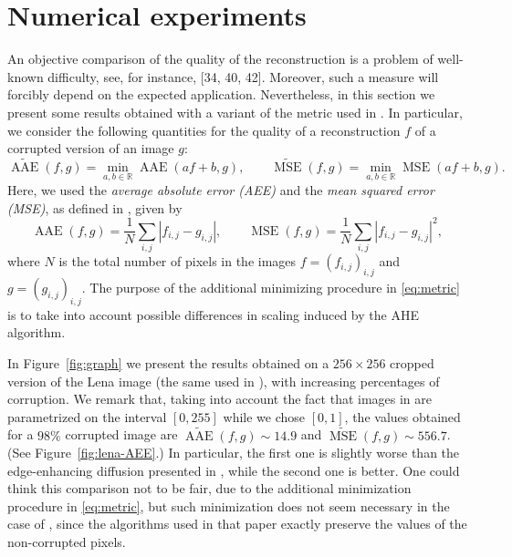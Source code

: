 \documentclass[proc]{edpsmath}
\begin{document}
{\color{magenta}
\section{Numerical experiments}\label{sec:comparison}

An objective comparison of the quality of the reconstruction is a problem of well-known difficulty, see, for instance, [34, 40, 42]. Moreover, such
a measure will forcibly depend on the expected application.
Nevertheless, in this section we present some results obtained with a variant of the metric used in \cite{GWWBBS}.
In particular, we consider the following quantities for the quality of a reconstruction $f$ of a corrupted version of an image $g$:
\begin{equation}\label{eq:metric}
  \widetilde{\operatorname{AAE}}(f,g) = \min_{a,b\in\mathbb R}\operatorname{AAE}(a f+b,g),\qquad
  \widetilde{\operatorname{MSE}}(f,g) = \min_{a,b\in\mathbb R}\operatorname{MSE}(a f+b,g).
\end{equation}
Here, we used the \emph{average absolute error (AEE)} and the \emph{mean squared error (MSE)}, as defined in \cite{GWWBBS}, given by
\begin{equation}
  \operatorname{AAE}(f,g) = \frac{1}{N}\sum_{i,j} |f_{i,j}-g_{i,j}|,\qquad
  \operatorname{MSE}(f,g) = \frac{1}{N}\sum_{i,j} |f_{i,j}-g_{i,j}|^2,
\end{equation}
where $N$ is the total number of pixels in the images $f=(f_{i,j})_{i,j}$ and $g=(g_{i,j})_{i,j}$. 
The purpose of the additional minimizing procedure in \eqref{eq:metric} is to take into account possible differences in scaling induced by the AHE algorithm. 

In Figure~\ref{fig:graph} we present the results obtained on a $256\times 256$ cropped version of the Lena image (the same used in \cite{GWWBBS}), with increasing percentages of corruption. 
We remark that, taking into account the fact that images in \cite{GWWBBS} are parametrized on the interval $[0,255]$ while we chose $[0,1]$, the values obtained for a $98\%$ corrupted image are $\widetilde{\operatorname{AAE}}(f,g)\sim14.9$ and $\widetilde{\operatorname{MSE}}(f,g)\sim556.7$. (See Figure~\ref{fig:lena-AEE}.) In particular, the first one is slightly worse than the edge-enhancing diffusion presented in \cite[Table~1]{GWWBBS}, while the second one is better.
One could think this comparison not to be fair, due to the additional minimization procedure in \eqref{eq:metric}, but such minimization does not seem necessary in the case of \cite{GWWBBS}, since the algorithms used in that paper exactly preserve the values of the non-corrupted pixels.

}
\end{document}
